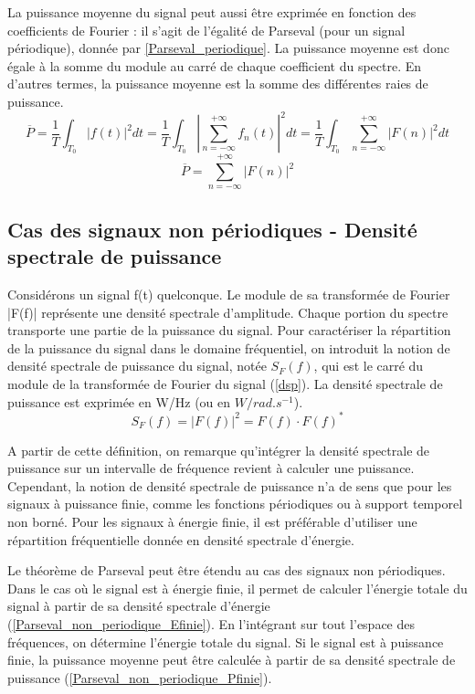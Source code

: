 	La puissance moyenne du signal peut aussi être exprimée en fonction des coefficients de Fourier : il s'agit de l'égalité de Parseval (pour un signal périodique), donnée par \ref{Parseval_periodique}. La puissance moyenne est donc égale à la somme du module au carré de chaque coefficient du spectre. En d'autres termes, la puissance moyenne est la somme des différentes raies de puissance.
	\begin{equation*}
	\overline{P}=\frac{1}{T}\int_{T_{0}}|f(t)|^{2}dt=\frac{1}{T}\int_{T_{0}}|\sum_{n=-\infty}^{+\infty}f_{n}(t)|^{2}dt=\frac{1}{T}\int_{T_{0}}\sum_{n=-\infty}^{+\infty}|F(n)|^{2}dt
	\end{equation*}
	\begin{equation}\label{Parseval_periodique}
	\overline{P}=\sum_{n=-\infty}^{+\infty}|F(n)|^{2}
	\end{equation}
	
 	
	\subsection{Cas des signaux non périodiques - Densité spectrale de puissance}
	
	Considérons un signal f(t) quelconque. Le module de sa transformée de Fourier |F(f)| représente une densité spectrale d'amplitude. Chaque portion du spectre transporte une partie de la puissance du signal. Pour caractériser la répartition de la puissance du signal dans le domaine fréquentiel, on introduit la notion de densité spectrale de puissance du signal, notée $S_{F}(f)$, qui est le carré du module de la transformée de Fourier du signal (\ref{dsp}). La densité spectrale de puissance est exprimée en W/Hz (ou en $W/rad.s^{-1}$).
	\begin{equation}\label{dsp}
	S_{F}(f)=|F(f)|^{2}=F(f)\cdot F(f)^{*}
	\end{equation}
	
	A partir de cette définition, on remarque qu'intégrer la densité spectrale de puissance sur un intervalle de fréquence revient à calculer une puissance.
	Cependant, la notion de densité spectrale de puissance n'a de sens que pour les signaux à puissance finie, comme les fonctions périodiques ou à support temporel non borné. Pour les signaux à énergie finie, il est préférable d'utiliser une répartition fréquentielle donnée en densité spectrale d'énergie.
	
	\vspace{0.5\baselineskip}
	
	Le théorème de Parseval peut être étendu au cas des signaux non périodiques. Dans le cas où le signal est à énergie finie, il permet de calculer l'énergie totale du signal à partir de sa densité spectrale d'énergie (\ref{Parseval_non_periodique_Efinie}). En l'intégrant sur tout l'espace des fréquences, on détermine l'énergie totale du signal. Si le signal est à puissance finie, la puissance moyenne peut être calculée à partir de sa densité spectrale de puissance (\ref{Parseval_non_periodique_Pfinie}).
	
